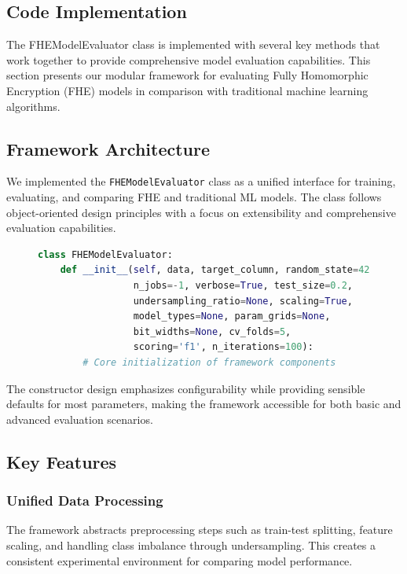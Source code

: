 \documentclass[a4paper,12pt]{article}
\begin{document}
\subsection{Code Implementation}
The FHEModelEvaluator class is implemented with several key methods that work together to provide comprehensive model evaluation capabilities. 
This section presents our modular framework for evaluating Fully Homomorphic Encryption (FHE) models in comparison with traditional machine learning algorithms.

\subsection{Framework Architecture}
We implemented the \texttt{FHEModelEvaluator} class as a unified interface for training, evaluating, and comparing FHE and traditional ML models. The class follows object-oriented design principles with a focus on extensibility and comprehensive evaluation capabilities.

\begin{figure}[h]
    \centering
    \begin{lstlisting}[language=Python, caption=Core initialization of FHEModelEvaluator class, label=lst:constructor]
class FHEModelEvaluator:
    def __init__(self, data, target_column, random_state=42, 
                 n_jobs=-1, verbose=True, test_size=0.2, 
                 undersampling_ratio=None, scaling=True,
                 model_types=None, param_grids=None, 
                 bit_widths=None, cv_folds=5, 
                 scoring='f1', n_iterations=100):
        # Core initialization of framework components
    \end{lstlisting}
\end{figure}

The constructor design emphasizes configurability while providing sensible defaults for most parameters, making the framework accessible for both basic and advanced evaluation scenarios.

\subsection{Key Features}
\subsubsection{Unified Data Processing}
The framework abstracts preprocessing steps such as train-test splitting, feature scaling, and handling class imbalance through undersampling. This creates a consistent experimental environment for comparing model performance.
\end{document}
